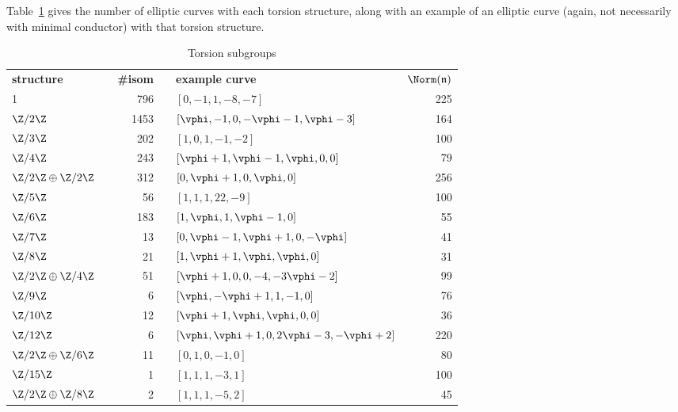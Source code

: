 \documentclass{amsart}
\newcommand{\n}{\mathfrak{n}}
\begin{document}
Table~\ref{table:torsion} gives the number of elliptic curves with each
torsion structure, along with an example of an elliptic curve (again, not necessarily with minimal conductor)
with that torsion structure.
\begin{center}
\begin{table}[h]
\caption{Torsion subgroups\label{table:torsion}}
\begin{tabular}{@{}lcrclr@{}}\toprule
\textbf{structure} & \phantom{a} & \textbf{\#isom} & \phantom{a} & \textbf{example curve} & $\Norm(\n)$ \\\cmidrule{1-1}\cmidrule{3-3}\cmidrule{5-6}
1                    & & 796  & & $[0,-1,1,-8,-7]$                      & 225 \\
$\Z/2\Z$             & & 1453 & & $[\vphi,-1,0,-\vphi-1,\vphi-3]$       & 164 \\
$\Z/3\Z$             & & 202  & & $[1,0,1,-1,-2]$                       & 100 \\
$\Z/4\Z$             & & 243  & & $[\vphi+1,\vphi-1,\vphi,0,0]$         & 79  \\
$\Z/2\Z\oplus\Z/2\Z$ & & 312  & & $[0,\vphi+1,0,\vphi,0]$               & 256 \\
$\Z/5\Z$             & & 56   & & $[1,1,1,22,-9]$                       & 100 \\
$\Z/6\Z$             & & 183  & & $[1,\vphi,1,\vphi-1,0]$               & 55  \\
$\Z/7\Z$             & & 13   & & $[0,\vphi-1,\vphi+1,0,-\vphi]$        & 41  \\
$\Z/8\Z$             & & 21   & & $[1,\vphi+1,\vphi,\vphi,0]$           & 31  \\
$\Z/2\Z\oplus\Z/4\Z$ & & 51   & & $[\vphi+1,0,0,-4,-3\vphi-2]$          & 99  \\
$\Z/9\Z$             & & 6    & & $[\vphi,-\vphi+1,1,-1,0]$             & 76  \\
$\Z/10\Z$            & & 12   & & $[\vphi+1,\vphi,\vphi,0,0]$           & 36  \\
$\Z/12\Z$            & & 6    & & $[\vphi,\vphi+1,0,2\vphi-3,-\vphi+2]$ & 220 \\
$\Z/2\Z\oplus\Z/6\Z$ & & 11   & & $[0,1,0,-1,0]$                        & 80  \\
$\Z/15\Z$            & & 1    & & $[1,1,1,-3,1]$                        & 100 \\
$\Z/2\Z\oplus\Z/8\Z$ & & 2    & & $[1,1,1,-5,2]$                        & 45  \\\bottomrule
\end{tabular}
\end{table}
\end{center}
\end{document}
